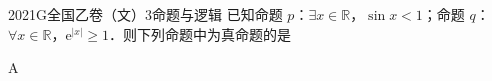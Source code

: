 
\begin{problem}{2021}{G}{全国乙卷（文）}{3}{命题与逻辑}
已知命题 $ p $：$ \exists x\in\mathbb{R} $，$ \sin x<1 $；命题 $ q $：$ \forall x\in\mathbb{R} $，$ \mathrm{e}^{|x|}\geq 1 $．则下列命题中为真命题的是
\begin{choices}
\end{choices}
\end{problem}

\begin{answer}
A
\end{answer}

\begin{solutions}

\end{solutions}
